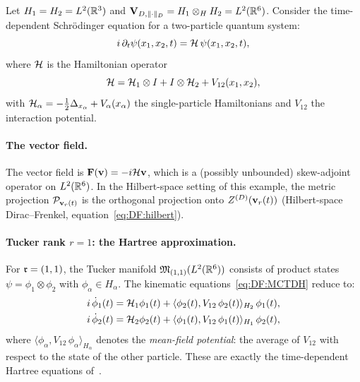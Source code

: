 \begin{example}
\label{ex:DF:schrodinger}
Let $H_1 = H_2 = L^2(\mathbb{R}^3)$ and $\mathbf{V}_{D,\|\cdot\|_D} = H_1 \otimes_H H_2
= L^2(\mathbb{R}^6)$. Consider the time-dependent Schrödinger equation
for a two-particle quantum system:
\begin{equation}
\label{eq:DF:schrodinger}
    i\,\partial_t \psi(x_1, x_2, t)
    = \mathcal{H}\,\psi(x_1, x_2, t),
\end{equation}
where $\mathcal{H}$ is the Hamiltonian operator
\begin{equation}
\label{eq:DF:hamiltonian}
    \mathcal{H} = \mathcal{H}_1 \otimes I + I \otimes \mathcal{H}_2
    + V_{12}(x_1, x_2),
\end{equation}
with $\mathcal{H}_\alpha = -\tfrac{1}{2}\Delta_{x_\alpha} + V_\alpha(x_\alpha)$
the single-particle Hamiltonians and $V_{12}$ the interaction potential.

\paragraph{The vector field.}
The vector field is $\mathbf{F}(\mathbf{v}) = -i\mathcal{H}\mathbf{v}$, which is a
(possibly unbounded) skew-adjoint operator on $L^2(\mathbb{R}^6)$. In the
Hilbert-space setting of this example, the metric projection
$\mathcal{P}_{\mathbf{v}_r(t)}$ is the orthogonal projection onto $Z^{(D)}(\mathbf{v}_r(t))$
(Hilbert-space Dirac--Frenkel, equation~\eqref{eq:DF:hilbert}).

\paragraph{Tucker rank $r=1$: the Hartree approximation.}
For $\mathfrak{r} = (1,1)$, the Tucker manifold $\mathfrak{M}_{(1,1)}(L^2(\mathbb{R}^6))$
consists of product states $\psi = \phi_1 \otimes \phi_2$ with
$\phi_\alpha \in H_\alpha$. The kinematic equations~\eqref{eq:DF:MCTDH}
reduce to:
\begin{subequations}
\label{eq:DF:hartree}
\begin{align}
    i\,\dot\phi_1(t) &= \mathcal{H}_1 \phi_1(t)
    + \langle \phi_2(t), V_{12}\,\phi_2(t)\rangle_{H_2}\,\phi_1(t),
    \label{eq:DF:hartree1}\\
    i\,\dot\phi_2(t) &= \mathcal{H}_2 \phi_2(t)
    + \langle \phi_1(t), V_{12}\,\phi_1(t)\rangle_{H_1}\,\phi_2(t),
    \label{eq:DF:hartree2}
\end{align}
\end{subequations}
where $\langle \phi_\alpha, V_{12}\,\phi_\alpha\rangle_{H_\alpha}$
denotes the \emph{mean-field potential}: the average of $V_{12}$ with
respect to the state of the other particle. These are exactly the
time-dependent Hartree equations of~\cite{Lubich2008}.


\end{example}
